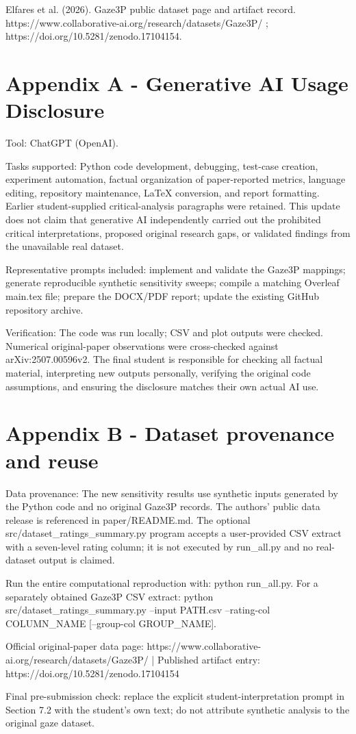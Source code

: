 \documentclass[11pt,a4paper]{article}
\begin{document}
Elfares et al. (2026). Gaze3P public dataset page and artifact record. https://www.collaborative-ai.org/research/datasets/Gaze3P/ ; https://doi.org/10.5281/zenodo.17104154.


\section*{Appendix A - Generative AI Usage Disclosure}

Tool: ChatGPT (OpenAI).


Tasks supported: Python code development, debugging, test-case creation, experiment automation, factual organization of paper-reported metrics, language editing, repository maintenance, LaTeX conversion, and report formatting. Earlier student-supplied critical-analysis paragraphs were retained. This update does not claim that generative AI independently carried out the prohibited critical interpretations, proposed original research gaps, or validated findings from the unavailable real dataset.


Representative prompts included: implement and validate the Gaze3P mappings; generate reproducible synthetic sensitivity sweeps; compile a matching Overleaf main.tex file; prepare the DOCX/PDF report; update the existing GitHub repository archive.


Verification: The code was run locally; CSV and plot outputs were checked. Numerical original-paper observations were cross-checked against arXiv:2507.00596v2. The final student is responsible for checking all factual material, interpreting new outputs personally, verifying the original code assumptions, and ensuring the disclosure matches their own actual AI use.


\section*{Appendix B - Dataset provenance and reuse}

Data provenance: The new sensitivity results use synthetic inputs generated by the Python code and no original Gaze3P records. The authors' public data release is referenced in paper/README.md. The optional src/dataset\_ratings\_summary.py program accepts a user-provided CSV extract with a seven-level rating column; it is not executed by run\_all.py and no real-dataset output is claimed.


Run the entire computational reproduction with: python run\_all.py. For a separately obtained Gaze3P CSV extract: python src/dataset\_ratings\_summary.py --input PATH.csv --rating-col COLUMN\_NAME [--group-col GROUP\_NAME].


Official original-paper data page: https://www.collaborative-ai.org/research/datasets/Gaze3P/  |  Published artifact entry: https://doi.org/10.5281/zenodo.17104154


Final pre-submission check: replace the explicit student-interpretation prompt in Section 7.2 with the student's own text; do not attribute synthetic analysis to the original gaze dataset.
\end{document}
